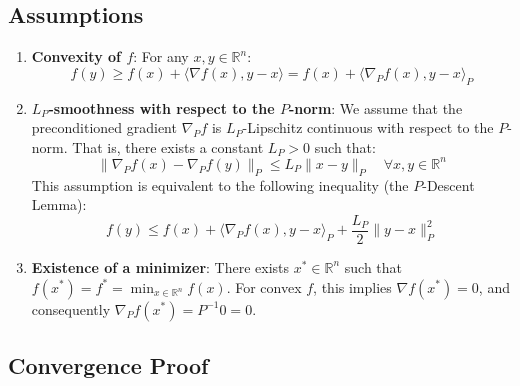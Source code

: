 \documentclass{article}
\newcommand{\R}{\mathbb{R}}
\newcommand{\normp}[1]{\|#1\|_P}       %
\newcommand{\ip}[2]{\langle #1, #2 \rangle} %
\newcommand{\grad}{\nabla}             %
\newcommand{\gradp}{\nabla_P}
\newcommand{\ipp}[2]{\langle #1, #2 \rangle_P} %
\begin{document}
\subsection*{Assumptions}
\begin{enumerate}
    \item \textbf{Convexity of $f$}: For any $x, y \in \R^n$:
          \begin{equation} \label{eq:convexity_p}
              f(y) \ge f(x) + \ip{\grad f(x)}{y-x} = f(x) + \ipp{\gradp f(x)}{y-x}
          \end{equation}
    \item \textbf{$L_P$-smoothness with respect to the $P$-norm}: We assume that the preconditioned gradient $\gradp f$ is $L_P$-Lipschitz continuous with respect to the $P$-norm. That is, there exists a constant $L_P > 0$ such that:
          \begin{equation} \label{eq:lp_smoothness}
              \normp{\gradp f(x) - \gradp f(y)} \le L_P \normp{x - y} \quad \forall x, y \in \R^n
          \end{equation}
          This assumption is equivalent to the following inequality (the $P$-Descent Lemma):
          \begin{equation} \label{eq:p_descent_lemma}
              f(y) \le f(x) + \ipp{\gradp f(x)}{y-x} + \frac{L_P}{2} \normp{y-x}^2
          \end{equation}
          
    \item \textbf{Existence of a minimizer}: There exists $x^* \in \R^n$ such that $f(x^*) = f^* = \min_{x \in \R^n} f(x)$. For convex $f$, this implies $\grad f(x^*) = 0$, and consequently $\gradp f(x^*) = P^{-1} 0 = 0$.
\end{enumerate}

\subsection*{Convergence Proof}
\end{document}
